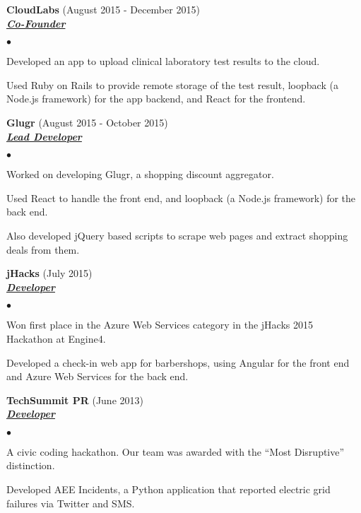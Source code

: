 \documentclass{article}
\newcommand{\employer}[3]{{ \textbf{#1} (#2)\\ \underline{\textbf{\emph{#3}}}\\  }}
\newenvironment{achievements}{\begin{list}{$\bullet$}{\topsep 0pt \itemsep -2pt}}{\vspace*{4pt}\end{list}}
\begin{document}
\employer{CloudLabs}{August 2015 - December 2015}{Co-Founder}
	\begin{achievements}
	\item Developed an app to upload clinical laboratory test results to the cloud.
	\item Used Ruby on Rails to provide remote storage of the test result, loopback (a Node.js framework) for the app backend, and React for the frontend.
	\end{achievements}

\employer{Glugr}{August 2015 - October 2015}{Lead Developer}
	\begin{achievements}
	\item Worked on developing Glugr, a shopping discount aggregator.
	\item Used React to handle the front end, and loopback (a Node.js framework) for the back end.
	\item Also developed jQuery based scripts to scrape web pages and extract shopping deals from them. 
	\end{achievements}

\employer{jHacks}{July 2015}{Developer}
	\begin{achievements}
	\item Won first place in the Azure Web Services category in the jHacks 2015 Hackathon at Engine4.
	\item Developed a check-in web app for barbershops, using Angular for the front end and Azure Web Services for the back end.
	\end{achievements}

\employer{TechSummit PR}{June 2013}{Developer}
	\begin{achievements}
	\item A civic coding hackathon. Our team was awarded with the ``Most Disruptive'' distinction.
	\item Developed AEE Incidents, a Python application that reported electric grid failures via Twitter and SMS.
	\end{achievements}
\end{document}
